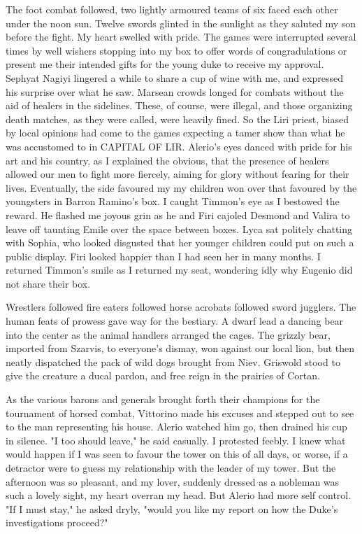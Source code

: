 \documentclass{article}
\begin{document}
The foot combat followed, two lightly armoured teams of six faced each other under the noon sun. Twelve swords glinted in the sunlight as they saluted my son before the fight. My heart swelled with pride. The games were interrupted several times by well wishers stopping into my box to offer words of congradulations or present me their intended gifts for the young duke to receive my approval. Sephyat Nagiyi lingered a while to share a cup of wine with me, and expressed his surprise over what he saw. Marsean crowds longed for combats without the aid of healers in the sidelines. These, of course, were illegal, and those organizing death matches, as they were called, were heavily fined. So the Liri priest, biased by local opinions had come to the games expecting a tamer show than what he was accustomed to in CAPITAL OF LIR. Alerio's eyes danced with pride for his art and his country, as I explained the obvious, that the presence of healers allowed our men to fight more fiercely, aiming for glory without fearing for their lives. Eventually, the side favoured my my children won over that favoured by the youngsters in Barron Ramino's box. I caught Timmon's eye as I bestowed the reward. He flashed me joyous grin as he and Firi cajoled Desmond and Valira to leave off taunting Emile over the space between boxes. Lyca sat politely chatting with Sophia, who looked disgusted that her younger children could put on such a public display. Firi looked happier than I had seen her in many months. I returned Timmon's smile as I returned my seat, wondering idly why Eugenio did not share their box.

Wrestlers followed fire eaters followed horse acrobats followed sword jugglers. The human feats of prowess gave way for the bestiary. A dwarf lead a dancing bear into the center as the animal handlers arranged the cages.  The grizzly bear, imported from Szarvis, to everyone's dismay, won against our local lion, but then neatly dispatched the pack of wild dogs brought from Niev. Griswold stood to give the creature a ducal pardon, and free reign in the prairies of Cortan.

As the various barons and generals brought forth their champions for the tournament of horsed combat, Vittorino made his excuses and stepped out to see to the man representing his house. Alerio watched him go, then drained his cup in silence. "I too should leave," he said casually. I protested feebly. I knew what would happen if I was seen to favour the tower on this of all days, or worse, if a detractor were to guess my relationship with the leader of my tower. But the afternoon was so pleasant, and my lover, suddenly dressed as a nobleman was such a lovely sight, my heart overran my head. But Alerio had more self control. "If I must stay," he asked dryly, "would you like my report on how the Duke's investigations proceed?"
\end{document}

